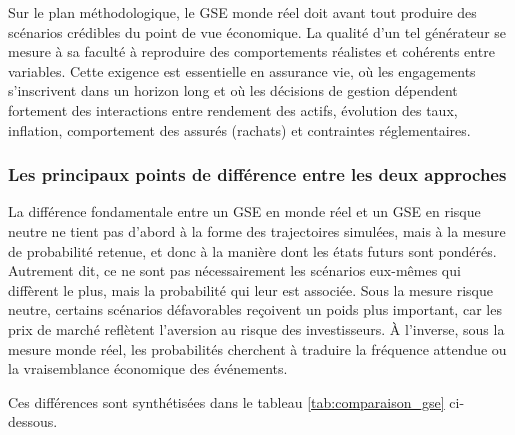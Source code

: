 Sur le plan méthodologique, le GSE monde réel doit avant tout produire des scénarios crédibles du point de vue économique. La qualité d'un tel générateur se mesure à sa faculté à reproduire des comportements réalistes et cohérents entre variables. Cette exigence est essentielle en assurance vie, où les engagements s'inscrivent dans un horizon long et où les décisions de gestion dépendent fortement des interactions entre rendement des actifs, évolution des taux, inflation, comportement des assurés (rachats) et contraintes réglementaires.

\subsubsection{Les principaux points de différence entre les deux approches}

La différence fondamentale entre un GSE en monde réel et un GSE en risque neutre ne tient pas d'abord à la forme des trajectoires simulées, mais à la mesure de probabilité retenue, et donc à la manière dont les états futurs sont pondérés. Autrement dit, ce ne sont pas nécessairement les scénarios eux-mêmes qui diffèrent le plus, mais la probabilité qui leur est associée. Sous la mesure risque neutre, certains scénarios défavorables reçoivent un poids plus important, car les prix de marché reflètent l'aversion au risque des investisseurs. À l'inverse, sous la mesure monde réel, les probabilités cherchent à traduire la fréquence attendue ou la vraisemblance économique des événements.

Ces différences sont synthétisées dans le tableau \ref{tab:comparaison_gse} ci-dessous.

